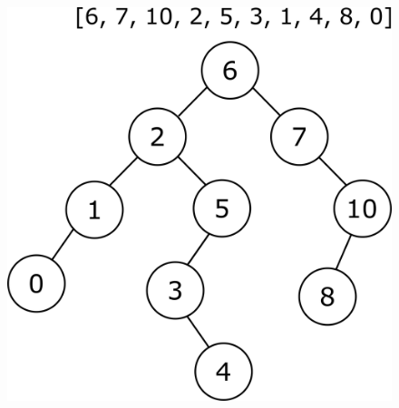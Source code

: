 \begin{figure}[h]
    \centering
    \includegraphics[scale=0.15]{Images/insertorder1.png}

\end{figure}
